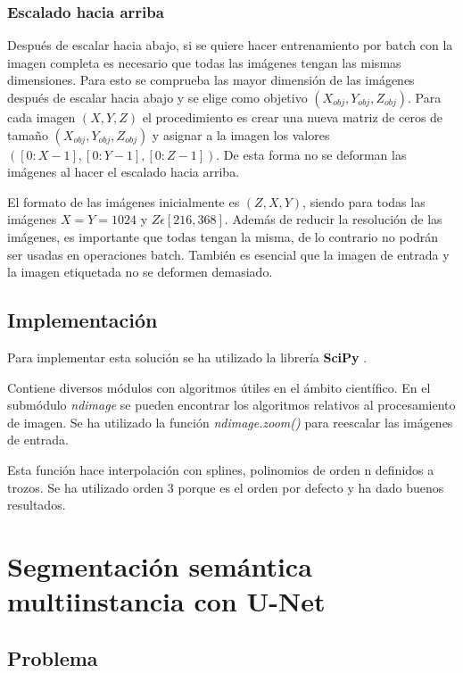 \subsubsection{Escalado hacia arriba}\label{subsubsec:upscale}

Después de escalar hacia abajo, si se quiere hacer entrenamiento por batch con la imagen completa es necesario que todas las imágenes tengan las mismas dimensiones. Para esto se comprueba las mayor dimensión de las imágenes después de escalar hacia abajo y se elige como objetivo $(X_{obj}, Y_{obj}, Z_{obj})$. Para cada imagen $(X, Y, Z)$ el procedimiento es crear una nueva matriz de ceros de tamaño $(X_{obj}, Y_{obj}, Z_{obj})$ y asignar a la imagen los valores $([0:X-1],[0:Y-1],[0:Z-1])$. De esta forma no se deforman las imágenes al hacer el escalado hacia arriba.

El formato de las imágenes inicialmente es $ (Z,X,Y) $, siendo para todas las imágenes $ X = Y = 1024 $ y $ Z\epsilon[216,368] $. Además de reducir la resolución de las imágenes, es importante que todas tengan la misma, de lo contrario no podrán ser usadas en operaciones batch. También es esencial que la imagen de entrada y la imagen etiquetada no se deformen demasiado.

\subsection{Implementación}\label{subsec:size_problem_implementation}

Para implementar esta solución se ha utilizado la librería \textbf{SciPy} \cite{Virtanen2020}. 

Contiene diversos módulos con algoritmos útiles en el ámbito científico. En el submódulo \textit{ndimage} se pueden encontrar los algoritmos relativos al procesamiento de imagen. Se ha utilizado la función \textit{ndimage.zoom()} para reescalar las imágenes de entrada.

Esta función hace interpolación con splines, polinomios de orden n definidos a trozos. Se ha utilizado orden 3 porque es el orden por defecto y ha dado buenos resultados.

\section{Segmentación semántica multiinstancia con U-Net}\label{sec:multiinstance_segm}

\subsection{Problema}\label{subsec:multi_problem}

